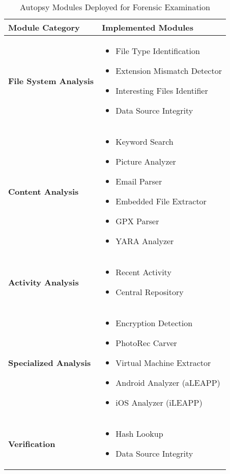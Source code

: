 \begin{table}[h]
\centering
\begin{tabular}{|p{5cm}|p{10cm}|}
\hline
\textbf{Module Category} & \textbf{Implemented Modules} \\
\hline
\textbf{File System Analysis} & 
\begin{itemize}
    \item File Type Identification
    \item Extension Mismatch Detector
    \item Interesting Files Identifier
    \item Data Source Integrity
\end{itemize} \\
\hline
\textbf{Content Analysis} & 
\begin{itemize}
    \item Keyword Search
    \item Picture Analyzer
    \item Email Parser
    \item Embedded File Extractor
    \item GPX Parser
    \item YARA Analyzer
\end{itemize} \\
\hline
\textbf{Activity Analysis} & 
\begin{itemize}
    \item Recent Activity
    \item Central Repository
\end{itemize} \\
\hline
\textbf{Specialized Analysis} & 
\begin{itemize}
    \item Encryption Detection
    \item PhotoRec Carver
    \item Virtual Machine Extractor
    \item Android Analyzer (aLEAPP)
    \item iOS Analyzer (iLEAPP)
\end{itemize} \\
\hline
\textbf{Verification} & 
\begin{itemize}
    \item Hash Lookup
    \item Data Source Integrity
\end{itemize} \\
\hline
\end{tabular}
\caption{Autopsy Modules Deployed for Forensic Examination}
\label{tab:autopsy_modules}
\end{table}

